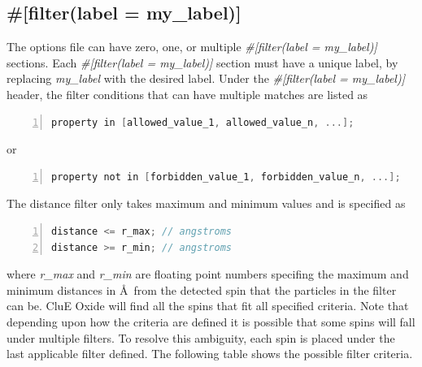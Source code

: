 \documentclass{book}
\begin{document}
\subsection{\#[filter(label = my\_label)]}
The options file can have zero, one, or multiple 
\textit{\#[filter(label = my\_label)]} sections.  
Each \textit{\#[filter(label = my\_label)]} section must have a unique label,
by replacing \textit{my\_label} with the desired label. 
Under the \textit{\#[filter(label = my\_label)]} header, 
the filter conditions that can have multiple matches 
are listed as
\begin{lstlisting}[frame=single,numbers=left,language=c]
property in [allowed_value_1, allowed_value_n, ...];
\end{lstlisting}
or
\begin{lstlisting}[frame=single,numbers=left,language=c]
property not in [forbidden_value_1, forbidden_value_n, ...];
\end{lstlisting}
The distance filter only takes maximum and minimum values and is specified 
as  
\begin{lstlisting}[frame=single,numbers=left,language=c]
distance <= r_max; // angstroms
distance >= r_min; // angstroms
\end{lstlisting}
where \textit{r\_max} and \textit{r\_min} are floating point numbers
specifing the maximum and minimum distances in \AA~from the detected spin
that the particles in the filter can be.
CluE Oxide will find all the spins that fit all specified criteria.
Note that depending upon how the criteria are defined it is possible that
some spins will fall under multiple filters.  
To resolve this ambiguity, each spin is placed under the
last applicable filter defined.  
The following table shows the possible filter criteria.
\end{document}
